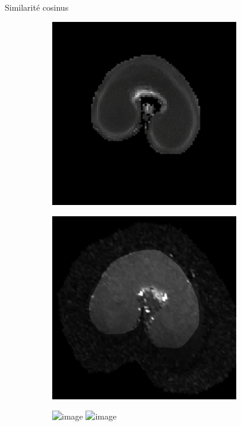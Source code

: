 \documentclass[10pt]{beamer}
\begin{document}
\begin{frame}{Similarité cosinus}
   \begin{figure}[ht]
    \centering
    \begin{subfigure}[t]{0.33\textwidth}
      \centering
      \includegraphics[width=0.9\textwidth]{fig/mri_slice8_250}
      \caption{}
      \label{subfig:mri_slice8_250}
    \end{subfigure}%
    \begin{subfigure}[t]{0.33\textwidth}
      \centering
      \includegraphics[width=0.9\textwidth]{fig/zonetir_2}%
      \caption{}
      \label{subfig:zonetir_0}
    \end{subfigure}%
    \begin{subfigure}[t]{0.33\textwidth}
      \centering
      \includegraphics<2>[width=0.9\textwidth]{fig/diff}%
      \includegraphics<3>[width=0.9\textwidth]{fig/diff_norm_sq}
    \end{subfigure}%


\end{figure}
\end{frame}
\end{document}
